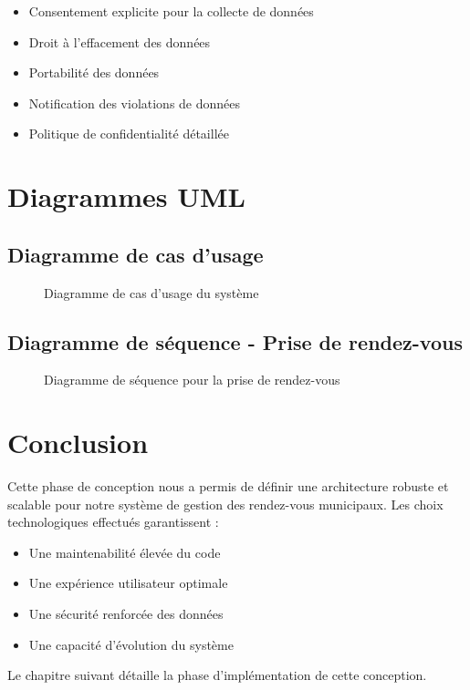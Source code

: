 \begin{itemize}
    \item Consentement explicite pour la collecte de données
    \item Droit à l'effacement des données
    \item Portabilité des données
    \item Notification des violations de données
    \item Politique de confidentialité détaillée
\end{itemize}

\section{Diagrammes UML}

\subsection{Diagramme de cas d'usage}

\begin{figure}[h]
    \centering
    \caption{Diagramme de cas d'usage du système}
    \label{fig:use_case}
\end{figure}

\subsection{Diagramme de séquence - Prise de rendez-vous}

\begin{figure}[h]
    \centering
    \caption{Diagramme de séquence pour la prise de rendez-vous}
    \label{fig:sequence_appointment}
\end{figure}

\section{Conclusion}

Cette phase de conception nous a permis de définir une architecture robuste et scalable pour notre système de gestion des rendez-vous municipaux. Les choix technologiques effectués garantissent :

\begin{itemize}
    \item Une maintenabilité élevée du code
    \item Une expérience utilisateur optimale
    \item Une sécurité renforcée des données
    \item Une capacité d'évolution du système
\end{itemize}

Le chapitre suivant détaille la phase d'implémentation de cette conception.
